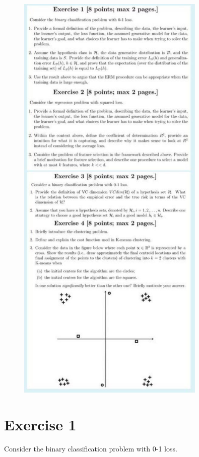 \documentclass[a4paper,11pt,oneside]{book}
\begin{document}
\begin{figure}[H]
    \centering
    \includegraphics[width=0.8\textwidth,height=0.8\textheight,keepaspectratio]{images/7_Set_2021.jpg}
\end{figure}

\clearpage 
\section{Exercise 1}
Consider the binary classification problem with 0-1 loss.
\end{document}

